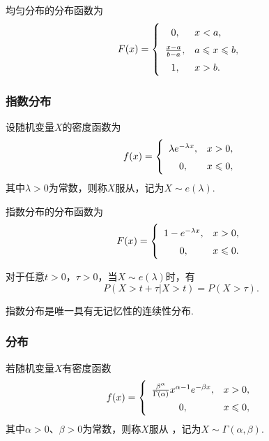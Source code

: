 \begin{theorem}
均匀分布的分布函数为\begin{equation}
F(x) = \left\{ \def\arraystretch{1.5}
\begin{array}{cl}
0, & x < a, \\
\frac{x-a}{b-a}, & a \leqslant x \leqslant b, \\
1, & x > b. \\
\end{array} \right.
\end{equation}
\end{theorem}

\subsubsection{指数分布}
\begin{definition}
设随机变量\(X\)的密度函数为\begin{equation}
f(x) = \left\{ \def\arraystretch{1.5}
\begin{array}{cl}
\lambda e^{-\lambda x}, & x > 0, \\
0, & x \leqslant 0, \\
\end{array} \right.
\end{equation}其中\(\lambda > 0\)为常数，则称\(X\)服从，记为\(X \sim e(\lambda)\).
\end{definition}

\begin{theorem}
指数分布的分布函数为\begin{equation}
F(x) = \left\{ \def\arraystretch{1.5}
\begin{array}{cl}
1 - e^{-\lambda x}, & x > 0, \\
0, & x \leqslant 0. \\
\end{array} \right.
\end{equation}
\end{theorem}

\begin{theorem}[指数分布的无记忆性]
对于任意\(t > 0\)，\(\tau > 0\)，当\(X \sim e(\lambda)\)时，有\[
P(X > t + \tau \vert X > t) = P(X > \tau).
\]

指数分布是唯一具有无记忆性的连续性分布.
\end{theorem}

\subsubsection{\textGamma 分布}
\begin{definition}
若随机变量\(X\)有密度函数\begin{equation}
f(x) = \left\{
\def\arraystretch{1.5}
\begin{array}{cl}
\frac{\beta^{\alpha}}{\Gamma(\alpha)} x^{\alpha-1} e^{-\beta x}, & x > 0, \\
0, & x \leqslant 0, \\
\end{array} \right.
\end{equation}其中\(\alpha > 0\)、\(\beta > 0\)为常数，则称\(X\)服从 ，记为\(X \sim \Gamma(\alpha,\beta)\).
\end{definition}

